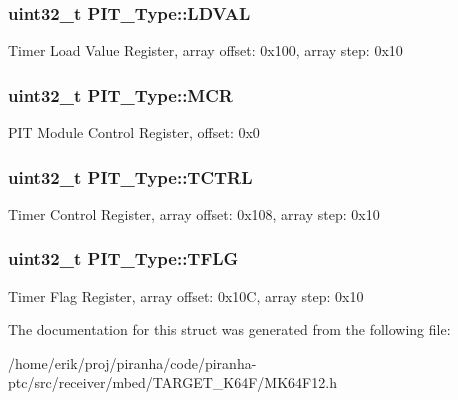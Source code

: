 \subsubsection[{\texorpdfstring{L\+D\+V\+AL}{LDVAL}}]{ uint32\+\_\+t P\+I\+T\+\_\+\+Type\+::\+L\+D\+V\+AL}\hypertarget{structPIT__Type_a6880c80d3b65e0e5831b72371f607224}{}\label{structPIT__Type_a6880c80d3b65e0e5831b72371f607224}
Timer Load Value Register, array offset\+: 0x100, array step\+: 0x10 
\subsubsection[{\texorpdfstring{M\+CR}{MCR}}]{ uint32\+\_\+t P\+I\+T\+\_\+\+Type\+::\+M\+CR}\hypertarget{structPIT__Type_ac2befe5f01ae11bccda33a84cff453b0}{}\label{structPIT__Type_ac2befe5f01ae11bccda33a84cff453b0}
P\+IT Module Control Register, offset\+: 0x0 
\subsubsection[{\texorpdfstring{T\+C\+T\+RL}{TCTRL}}]{ uint32\+\_\+t P\+I\+T\+\_\+\+Type\+::\+T\+C\+T\+RL}\hypertarget{structPIT__Type_a1efb9476e302dfe00faf684173c5b6ea}{}\label{structPIT__Type_a1efb9476e302dfe00faf684173c5b6ea}
Timer Control Register, array offset\+: 0x108, array step\+: 0x10 
\subsubsection[{\texorpdfstring{T\+F\+LG}{TFLG}}]{ uint32\+\_\+t P\+I\+T\+\_\+\+Type\+::\+T\+F\+LG}\hypertarget{structPIT__Type_af54765dd193a93cd7bddf1eb6b0c30fa}{}\label{structPIT__Type_af54765dd193a93cd7bddf1eb6b0c30fa}
Timer Flag Register, array offset\+: 0x10C, array step\+: 0x10 

The documentation for this struct was generated from the following file\+:\begin{DoxyCompactItemize}
\item 
/home/erik/proj/piranha/code/piranha-\/ptc/src/receiver/mbed/\+T\+A\+R\+G\+E\+T\+\_\+\+K64\+F/M\+K64\+F12.\+h\end{DoxyCompactItemize}
